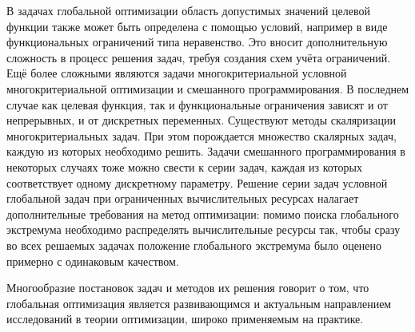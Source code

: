 В задачах глобальной оптимизации область допустимых значений целевой функции также может быть определена
с помощью условий, например в виде функциональных ограничений типа неравенство. Это вносит дополнительную сложность в процесс решения
задач, требуя создания схем учёта ограничений. Ещё более сложными являются задачи многокритериальной условной многокритериальной
оптимизации и смешанного программирования. В последнем случае как целевая функция, так и функциональные ограничения
зависят и от непрерывных, и от дискретных переменных. Существуют методы скаляризации многокритериальных задач.
При этом порождается множество скалярных задач, каждую из которых необходимо решить. Задачи смешанного программирования
в некоторых случаях тоже можно свести к серии задач, каждая из которых соответствует одному дискретному параметру.
Решение серии задач условной глобальной задач при ограниченных вычислительных
ресурсах налагает дополнительные требования на метод оптимизации: помимо поиска глобального экстремума необходимо
распределять вычислительные ресурсы так, чтобы сразу во всех решаемых задачах положение глобального
экстремума было оценено примерно с одинаковым качеством.

Многообразие постановок задач и методов их решения говорит о том, что глобальная оптимизация
является развивающимся и актуальным направлением исследований в теории оптимизации, широко применяемым на практике.




